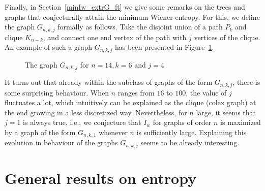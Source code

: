 \documentclass{article}
\begin{document}
{Finally, in Section~\ref{minIw_extrG_ft} we give some remarks on the trees and graphs that conjecturally attain the minimum Wiener-entropy. 
For this, we define the graph $G_{n,k,j}$ formally as follows.
Take the disjoint union of a path $P_k$ and clique $K_{n-k}$, and connect one end vertex of the path with $j$ vertices of the clique. An example of such a graph $G_{n,k,j}$ has been presented in Figure~\ref{fig:graphGnkj}.

\begin{figure}[ht]
\centering
{}
\caption{The graph $G_{n,k,j}$ for $n=14, k=6$ and $j=4$}\label{fig:graphGnkj}
\end{figure}


It turns out that already within the subclass of graphs of the form $G_{n,k,j}$, there is some surprising behaviour.
When $n$ ranges from $16$ to $100$, the value of $j$ fluctuates a lot, which intuitively can be explained as the clique (colex graph) at the end growing in a less discretized way.
Nevertheless, for $n$ large, it seems that $j=1$ is always true, i.e., we conjecture that $I_w$ for graphs of order $n$ is maximized by a graph of the form $G_{n,k,1}$ whenever $n$ is sufficiently large. 
Explaining this evolution in behaviour of the graphs $G_{n,k,j}$ seems to be already interesting.  



\section{General results on entropy}\label{sec:gen}

}
\end{document}
